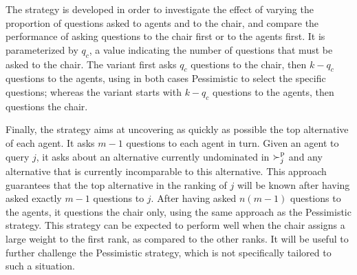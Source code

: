 \documentclass{article}
\begin{document}
The  strategy is developed in order to investigate the effect of varying the proportion of questions asked to agents and to the chair, and compare the performance of asking questions to the chair first or to the agents first. It is parameterized by $q_c$, a value indicating the number of questions that must be asked to the chair.
The  variant first asks $q_c$ questions to the chair, then $k - q_c$ questions to the agents, using in both cases Pessimistic to select the specific questions; whereas the  variant starts with $k - q_c$ questions to the agents, then questions the chair. 

Finally, the  strategy aims at uncovering as quickly as possible the top alternative of each agent. It asks $m - 1$ questions to each agent in turn. 
Given an agent to query $j$, it asks about an alternative currently undominated in $\succ^\text{p}_j$ and any alternative that is currently incomparable to this alternative. This approach guarantees that the top alternative in the ranking of $j$ will be known after having asked exactly $m-1$ questions to $j$.
After having asked $n (m-1)$ questions to the agents, it questions the chair only, using the same approach as the Pessimistic strategy.
This strategy can be expected to perform well when the chair assigns a large weight to the first rank, as compared to the other ranks. It will be useful to further challenge the Pessimistic strategy, which is not specifically tailored to such a situation.

\end{document}

